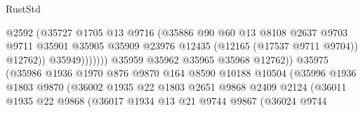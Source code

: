 \begin{lexlean}{RustStd}
\begin{coremodule}
                                            @2592
                                            (@35727
                                              @1705
                                              @13
                                              @9716
                                              (@35886
                                                @90
                                                @60
                                                @13
                                                @8108
                                                @2637
                                                @9703
                                                @9711
                                                @35901
                                                @35905
                                                @35909
                                                @23976
                                                @12435
                                                (@12165 (@17537 @9711 @9704))
                                                @12762))
                                            @35949)))))))
                              @35959
                              @35962
                              @35965
                              @35968
                              @12762))
                          @35975
                          (@35986
                            @1936
                            @1970
                            @876
                            @9870
                            @164
                            @8590
                            @10188
                            @10504
                            (@35996
                              @1936
                              @1803
                              @9870
                              (@36002
                                @1935
                                @22
                                @1803
                                @2651
                                @9868
                                @2409
                                @2124
                                (@36011
                                  @1935
                                  @22
                                  @9868
                                  (@36017
                                    @1934
                                    @13
                                    @21
                                    @9744
                                    @9867
                                    (@36024
                                      @9744

\end{coremodule}
\end{lexlean}
